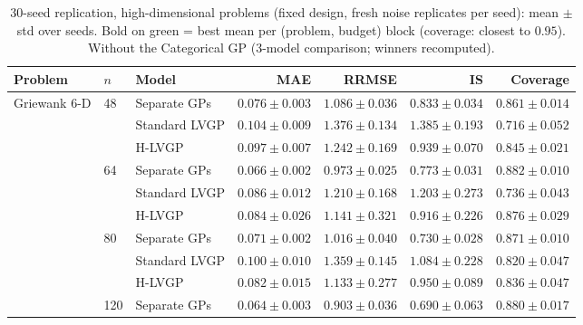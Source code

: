 \begin{table}[htbp]
\centering
\small
\setlength{\tabcolsep}{3pt}
\caption{30-seed replication, high-dimensional problems (fixed design, fresh noise replicates per seed): mean $\pm$ std over seeds. Bold on green = best mean per (problem, budget) block (coverage: closest to $0.95$). Without the Categorical GP (3-model comparison; winners recomputed).}
\label{tab:seeds_hd_nocat}
\begin{tabular}{lllrrrr}
\toprule
Problem & $n$ & Model & MAE & RRMSE & IS & Coverage \\
\midrule
\multirow{15}{*}{Griewank 6-D} & \multirow{3}{*}{48} & Separate GPs & \colorbox{green!20}{\boldmath$0.076 \pm 0.003$} & \colorbox{green!20}{\boldmath$1.086 \pm 0.036$} & \colorbox{green!20}{\boldmath$0.833 \pm 0.034$} & \colorbox{green!20}{\boldmath$0.861 \pm 0.014$} \\
 &  & Standard LVGP & $0.104 \pm 0.009$ & $1.376 \pm 0.134$ & $1.385 \pm 0.193$ & $0.716 \pm 0.052$ \\
 &  & H-LVGP & $0.097 \pm 0.007$ & $1.242 \pm 0.169$ & $0.939 \pm 0.070$ & $0.845 \pm 0.021$ \\
\cmidrule(lr){2-7}
 & \multirow{3}{*}{64} & Separate GPs & \colorbox{green!20}{\boldmath$0.066 \pm 0.002$} & \colorbox{green!20}{\boldmath$0.973 \pm 0.025$} & \colorbox{green!20}{\boldmath$0.773 \pm 0.031$} & \colorbox{green!20}{\boldmath$0.882 \pm 0.010$} \\
 &  & Standard LVGP & $0.086 \pm 0.012$ & $1.210 \pm 0.168$ & $1.203 \pm 0.273$ & $0.736 \pm 0.043$ \\
 &  & H-LVGP & $0.084 \pm 0.026$ & $1.141 \pm 0.321$ & $0.916 \pm 0.226$ & $0.876 \pm 0.029$ \\
\cmidrule(lr){2-7}
 & \multirow{3}{*}{80} & Separate GPs & \colorbox{green!20}{\boldmath$0.071 \pm 0.002$} & \colorbox{green!20}{\boldmath$1.016 \pm 0.040$} & \colorbox{green!20}{\boldmath$0.730 \pm 0.028$} & \colorbox{green!20}{\boldmath$0.871 \pm 0.010$} \\
 &  & Standard LVGP & $0.100 \pm 0.010$ & $1.359 \pm 0.145$ & $1.084 \pm 0.228$ & $0.820 \pm 0.047$ \\
 &  & H-LVGP & $0.082 \pm 0.015$ & $1.133 \pm 0.277$ & $0.950 \pm 0.089$ & $0.836 \pm 0.047$ \\
\cmidrule(lr){2-7}
 & \multirow{3}{*}{120} & Separate GPs & \colorbox{green!20}{\boldmath$0.064 \pm 0.003$} & \colorbox{green!20}{\boldmath$0.903 \pm 0.036$} & \colorbox{green!20}{\boldmath$0.690 \pm 0.063$} & \colorbox{green!20}{\boldmath$0.880 \pm 0.017$} \\

\end{tabular}
\end{table}
